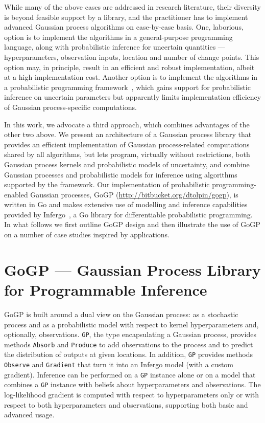\documentclass[sigplan,review]{acmart}\settopmatter{printfolios=true,printccs=false,printacmref=false}
\begin{document}
While many of the above cases are addressed in research
literature, their diversity is beyond feasible support by a
library, and the practitioner has to implement advanced Gaussian
process algorithms on case-by-case basis. One, laborious, option
is to implement the algorithms in a general-purpose programming
language, along with probabilistic inference for uncertain
quantities --- hyperparameters, observation inputs, location and
number of change points.  This option may, in principle, result
in an efficient and robust implementation, albeit at a high
implementation cost. Another option is to implement the
algorithms in a probabilistic programming
framework~\cite{TMY+16,Stan17,GXG18},
which gains support for probabilistic inference on uncertain
parameters but apparently limits implementation efficiency of
Gaussian process-specific computations.

In this work, we advocate a third approach, which combines
advantages of the other two above. We present an architecture of
a Gaussian process library that provides an efficient
implementation of Gaussian process-related computations shared
by all algorithms, but lets program, virtually without
restrictions, both Gaussian process kernels and probabilistic
models of uncertainty, and combine Gaussian processes and
probabilistic models for inference using algorithms supported by
the framework. Our implementation of probabilistic
programming-enabled Gaussian processes, GoGP
(\url{http://bitbucket.org/dtolpin/gogp}), is written in Go
and makes extensive use of modelling and inference capabilities
provided by Infergo~\cite{T19}, a Go library for differentiable
probabilistic programming. In what follows we first outline GoGP
design  and then illustrate the use of GoGP on a number of case
studies inspired by applications.

\section{GoGP --- Gaussian Process Library for Programmable Inference}

GoGP is built around a dual view on the Gaussian process: as a
stochastic process and as a probabilistic model with respect
to kernel hyperparameters and, optionally, observations.
\lstinline{GP}, the type encapsulating a Gaussian process,
provides methods \lstinline{Absorb} and \lstinline{Produce} to 
add observations to the process and to predict the distribution
of outputs at given locations. In addition, \lstinline{GP}
provides methods \lstinline{Observe} and \lstinline{Gradient}
that turn it into an Infergo model (with a custom gradient).
Inference can be performed on a \lstinline{GP} instance alone
or on a model that combines a \lstinline{GP} instance with
beliefs about hyperparameters and observations.  The
log-likelihood gradient is computed with respect to
hyperparameters only or with respect to both hyperparameters and
observations, supporting both basic and advanced usage.
\end{document}

